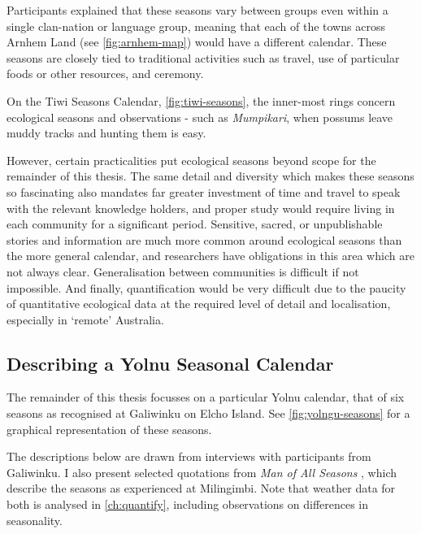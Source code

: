 Participants explained that these seasons vary between groups even within
a single clan-nation or language group, meaning that each of the towns
across Arnhem Land (see \autoref{fig:arnhem-map}) would have a different
calendar.  
%
These seasons are closely tied to traditional activities such as travel,
use of particular foods or other resources, and ceremony.

On the Tiwi Seasons Calendar, \autoref{fig:tiwi-seasons}, the inner-most
rings concern ecological seasons and observations - such as
\textit{Mumpikari}, when possums leave muddy tracks and hunting them is easy.

However, certain practicalities put ecological seasons beyond scope
for the remainder of this thesis.
%
The same detail and diversity which makes these seasons so fascinating
also mandates far greater investment of time and travel to speak
with the relevant knowledge holders, and proper study would require
living in each community for a significant period.
%
Sensitive, sacred, or unpublishable stories and information are much more
common around ecological seasons than the more general calendar,
and researchers have obligations in this area which are not always clear.
%
Generalisation between communities is difficult if not impossible.
%
And finally, quantification would be very difficult due to the paucity
of quantitative ecological data at the required level of detail
and localisation, especially in `remote' Australia.





\subsection{Describing a Yolnu Seasonal Calendar}

The remainder of this thesis focusses on a particular Yolnu calendar,
that of six seasons as recognised at Galiwinku on Elcho Island.
See \autoref{fig:yolngu-seasons} for a graphical representation of these seasons.

The descriptions below are drawn from interviews with participants from Galiwinku.
I also present selected quotations from \textit{Man of All Seasons} \citep{davis1989},
which describe the seasons as experienced at Milingimbi.
Note that weather data for both is analysed in \autoref{ch:quantify},
including observations on differences in seasonality.


